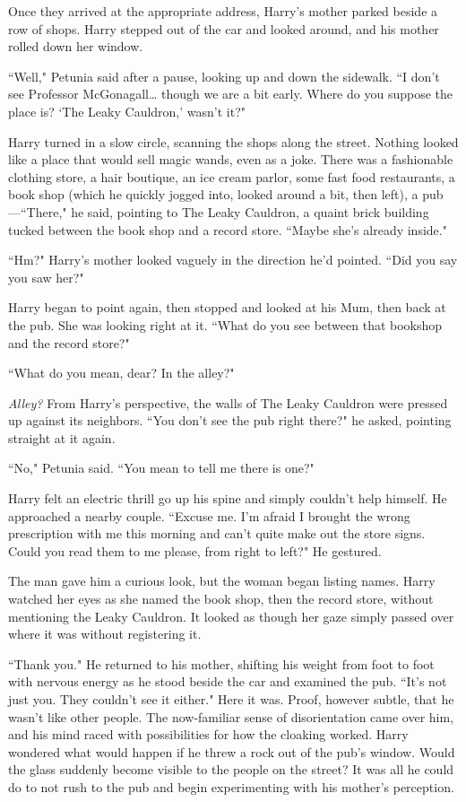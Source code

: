 Once they arrived at the appropriate address, Harry's mother parked beside a row of shops. Harry stepped out of the car and looked around, and his mother rolled down her window.

``Well," Petunia said after a pause, looking up and down the sidewalk. ``I don't see Professor McGonagall{\ldots} though we are a bit early. Where do you suppose the place is? `The Leaky Cauldron,' wasn't it?"

Harry turned in a slow circle, scanning the shops along the street. Nothing looked like a place that would sell magic wands, even as a joke. There was a fashionable clothing store, a hair boutique, an ice cream parlor, some fast food restaurants, a book shop (which he quickly jogged into, looked around a bit, then left), a pub---``There," he said, pointing to The Leaky Cauldron, a quaint brick building tucked between the book shop and a record store. ``Maybe she's already inside."

``Hm?" Harry's mother looked vaguely in the direction he'd pointed. ``Did you say you saw her?"

Harry began to point again, then stopped and looked at his Mum, then back at the pub. She was looking right at it. ``What do you see between that bookshop and the record store?"

``What do you mean, dear? In the alley?"

\emph{Alley?} From Harry's perspective, the walls of The Leaky Cauldron were pressed up against its neighbors. ``You don't see the pub right there?" he asked, pointing straight at it again.

``No," Petunia said. ``You mean to tell me there is one?"

Harry felt an electric thrill go up his spine and simply couldn't help himself. He approached a nearby couple. ``Excuse me. I'm afraid I brought the wrong prescription with me this morning and can't quite make out the store signs. Could you read them to me please, from right to left?" He gestured.

The man gave him a curious look, but the woman began listing names. Harry watched her eyes as she named the book shop, then the record store, without mentioning the Leaky Cauldron. It looked as though her gaze simply passed over where it was without registering it.

``Thank you." He returned to his mother, shifting his weight from foot to foot with nervous energy as he stood beside the car and examined the pub. ``It's not just you. They couldn't see it either." Here it was. Proof, however subtle, that he wasn't like other people. The now-familiar sense of disorientation came over him, and his mind raced with possibilities for how the cloaking worked. Harry wondered what would happen if he threw a rock out of the pub's window. Would the glass suddenly become visible to the people on the street? It was all he could do to not rush to the pub and begin experimenting with his mother's perception.

